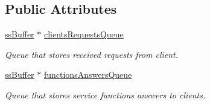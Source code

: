 \subsection*{Public Attributes}
\begin{DoxyCompactItemize}
\item 
\hyperlink{classssBuffer}{ssBuffer} $\ast$ \hyperlink{classsrvAppLayer_a79e7499e8647eb0f0ba4fd9613fd48c0}{clientsRequestsQueue}
\begin{DoxyCompactList}\small\item\em Queue that stores received requests from client. \item\end{DoxyCompactList}\item 
\hyperlink{classssBuffer}{ssBuffer} $\ast$ \hyperlink{classsrvAppLayer_a6c6ddd6197dc92d2812ed3de418e4b5e}{functionsAnswersQueue}
\begin{DoxyCompactList}\small\item\em Queue that stores service functions answers to clients. \item\end{DoxyCompactList}\end{DoxyCompactItemize}
